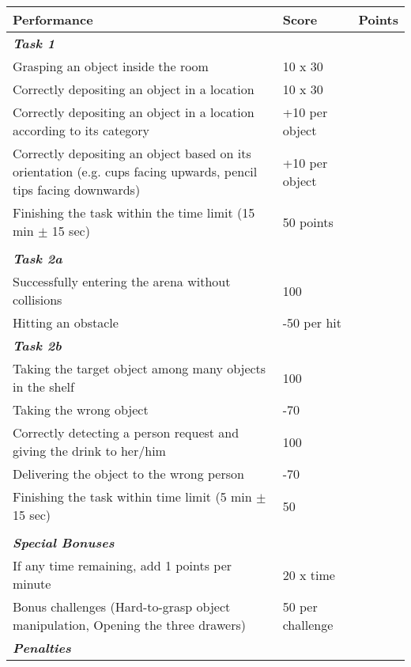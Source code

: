 \documentclass{article}
\begin{document}
\begin{center}
\begin{tabular}{ |m{8cm}|m{3cm}|m{1cm}| } 
    \hline
    \textbf{Performance} & \textbf{Score} & \textbf{Points} \\ 
    \hline
    \textbf{\textit{Task 1}} & & \\ 
    \hline
    Grasping an object inside the room & 10 x 30 & \\ 
    \hline
    Correctly depositing an object in a location & 10 x 30 & \\ 
    \hline
    Correctly depositing an object in a location according to its category & +10 per object & \\ 
    \hline
    Correctly depositing an object based on its orientation (e.g. cups facing upwards, pencil tips facing downwards) & +10 per object & \\
    \hline
    Finishing the task within the time limit (15 min $\pm$ 15 sec) & 50 points & \\ 
    \hline
    & & \\ 
    \hline
    \textbf{\textit{Task 2a}} & & \\ 
    \hline
    Successfully entering the arena without collisions & 100 & \\ 
    \hline
    Hitting an obstacle & -50 per hit & \\ 
    \hline
    \textbf{\textit{Task 2b}} & & \\ 
    \hline
    Taking the target object among many objects in the shelf & 100 & \\ 
    \hline
    Taking the wrong object & -70 & \\ 
    \hline
    Correctly detecting a person request and giving the drink to her/him & 100 & \\ 
    \hline
    Delivering the object to the wrong person & -70 & \\ 
    \hline
    Finishing the task within time limit (5 min $\pm$ 15 sec) & 50 & \\ 
    \hline
     & & \\ 
    \hline
    \textbf{\textit{Special Bonuses}} & & \\ 
    \hline
    If any time remaining, add 1 points per minute & 20 x time & \\ 
    \hline
    Bonus challenges (Hard-to-grasp object manipulation, Opening the three drawers) & 50 per challenge & \\ 
    \hline
    \textbf{\textit{Penalties}} & & \\ 

\end{tabular}
\end{center}
\end{document}
